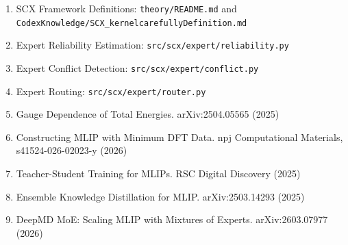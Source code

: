 \documentclass[
  12pt,
]{article}
\providecommand{\tightlist}{%
  \setlength{\itemsep}{0pt}\setlength{\parskip}{0pt}}
\begin{document}
\begin{enumerate}
\def\labelenumi{\arabic{enumi}.}
\tightlist
\item
  SCX Framework Definitions: \texttt{theory/README.md} and
  \texttt{CodexKnowledge/SCX\_kernelcarefullyDefinition.md}
\item
  Expert Reliability Estimation: \texttt{src/scx/expert/reliability.py}
\item
  Expert Conflict Detection: \texttt{src/scx/expert/conflict.py}
\item
  Expert Routing: \texttt{src/scx/expert/router.py}
\item
  Gauge Dependence of Total Energies. arXiv:2504.05565 (2025)
\item
  Constructing MLIP with Minimum DFT Data. npj Computational Materials,
  s41524-026-02023-y (2026)
\item
  Teacher-Student Training for MLIPs. RSC Digital Discovery (2025)
\item
  Ensemble Knowledge Distillation for MLIP. arXiv:2503.14293 (2025)
\item
  DeepMD MoE: Scaling MLIP with Mixtures of Experts. arXiv:2603.07977
  (2026)
\end{enumerate}
\end{document}
